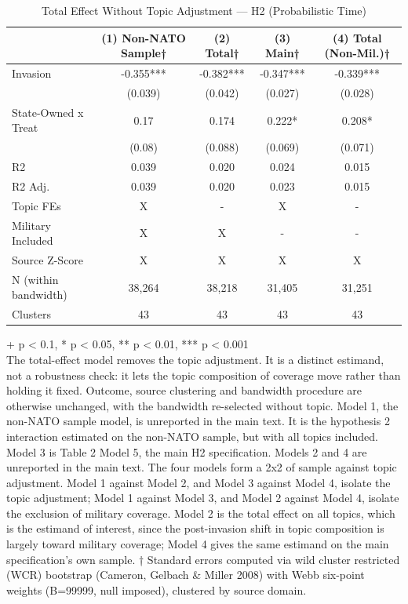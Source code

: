 \begin{table}[t]
\caption{\label{tab:s14b}Total Effect Without Topic Adjustment — H2 (Probabilistic Time)}
\fontsize{12.0pt}{14.0pt}\selectfont
\begin{tabular*}{\linewidth}{@{\extracolsep{\fill}}lcccc}
\toprule
  & (1) Non-NATO Sample† & (2) Total† & (3) Main† & (4) Total (Non-Mil.)† \\ 
\midrule\addlinespace[2.5pt]
Invasion & -0.355*** & -0.382*** & -0.347*** & -0.339*** \\ 
 & (0.039) & (0.042) & (0.027) & (0.028) \\ 
State-Owned x Treat & 0.17 & 0.174 & 0.222* & 0.208* \\ 
{} & {(0.08)} & {(0.088)} & {(0.069)} & {(0.071)} \\ 
R2 & 0.039 & 0.020 & 0.024 & 0.015 \\ 
R2 Adj. & 0.039 & 0.020 & 0.023 & 0.015 \\ 
Topic FEs & X & - & X & - \\ 
Military Included & X & X & - & - \\ 
Source Z-Score & X & X & X & X \\ 
N (within bandwidth) & 38,264 & 38,218 & 31,405 & 31,251 \\ 
Clusters & 43 & 43 & 43 & 43 \\ 
\bottomrule
\end{tabular*}
\begin{minipage}{\linewidth}
\vspace{.05em}
+ p < 0.1, * p < 0.05, ** p < 0.01, *** p < 0.001\\
The total-effect model removes the topic adjustment. It is a distinct estimand,
not a robustness check: it lets the topic composition of coverage move rather
than holding it fixed. Outcome, source clustering and bandwidth procedure are
otherwise unchanged, with the bandwidth re-selected without topic. Model 1,
the non-NATO sample model, is unreported in the main text. It is the hypothesis
2 interaction estimated on the non-NATO sample, but with all topics included.
Model 3 is Table 2 Model 5, the main H2 specification. Models 2 and 4 are
unreported in the main text. The four models form a 2x2 of sample against topic
adjustment. Model 1 against Model 2, and Model 3 against Model 4, isolate the
topic adjustment; Model 1 against Model 3, and Model 2 against Model 4, isolate
the exclusion of military coverage. Model 2 is the total effect on all topics,
which is the estimand of interest, since the post-invasion shift in topic
composition is largely toward military coverage; Model 4 gives the same estimand
on the main specification's own sample. † Standard errors computed via wild
cluster restricted (WCR) bootstrap (Cameron, Gelbach \& Miller 2008) with Webb
six-point weights (B=99999, null imposed), clustered by source domain.\\
\end{minipage}
\end{table}


